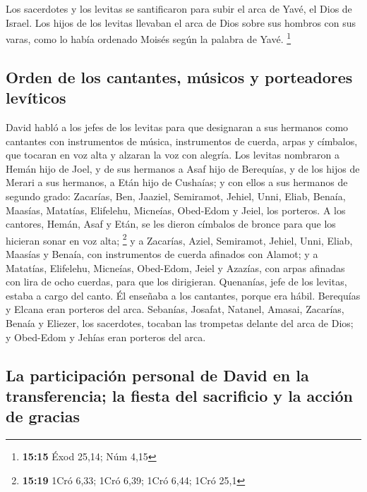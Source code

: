 \begin{paracol}{2}
 Los sacerdotes y los levitas se santificaron para subir
el arca de Yavé, el Dios de Israel.  Los hijos de los
levitas llevaban el arca de Dios sobre sus hombros con sus varas, como
lo había ordenado Moisés según la palabra de Yavé. \footnote{\textbf{15:15}
  Éxod 25,14; Núm 4,15}

\hypertarget{orden-de-los-cantantes-muxfasicos-y-porteadores-levuxedticos}{%
\subsection{Orden de los cantantes, músicos y porteadores
levíticos}\label{orden-de-los-cantantes-muxfasicos-y-porteadores-levuxedticos}}

 David habló a los jefes de los levitas para que
designaran a sus hermanos como cantantes con instrumentos de música,
instrumentos de cuerda, arpas y címbalos, que tocaran en voz alta y
alzaran la voz con alegría.  Los levitas nombraron a
Hemán hijo de Joel, y de sus hermanos a Asaf hijo de Berequías, y de los
hijos de Merari a sus hermanos, a Etán hijo de Cushaías; 
y con ellos a sus hermanos de segundo grado: Zacarías, Ben, Jaaziel,
Semiramot, Jehiel, Unni, Eliab, Benaía, Maasías, Matatías, Elifelehu,
Micneías, Obed-Edom y Jeiel, los porteros.  A los
cantores, Hemán, Asaf y Etán, se les dieron címbalos de bronce para que
los hicieran sonar en voz alta; \footnote{\textbf{15:19} 1Cró 6,33; 1Cró
  6,39; 1Cró 6,44; 1Cró 25,1}  y a Zacarías, Aziel,
Semiramot, Jehiel, Unni, Eliab, Maasías y Benaía, con instrumentos de
cuerda afinados con Alamot;  y a Matatías, Elifelehu,
Micneías, Obed-Edom, Jeiel y Azazías, con arpas afinadas con lira de
ocho cuerdas, para que los dirigieran.  Quenanías, jefe
de los levitas, estaba a cargo del canto. Él enseñaba a los cantantes,
porque era hábil.  Berequías y Elcana eran porteros del
arca.  Sebanías, Josafat, Natanel, Amasai, Zacarías,
Benaía y Eliezer, los sacerdotes, tocaban las trompetas delante del arca
de Dios; y Obed-Edom y Jehías eran porteros del arca.

\hypertarget{la-participaciuxf3n-personal-de-david-en-la-transferencia-la-fiesta-del-sacrificio-y-la-acciuxf3n-de-gracias}{%
\subsection{La participación personal de David en la transferencia; la
fiesta del sacrificio y la acción de
gracias}\label{la-participaciuxf3n-personal-de-david-en-la-transferencia-la-fiesta-del-sacrificio-y-la-acciuxf3n-de-gracias}}


\end{paracol}
